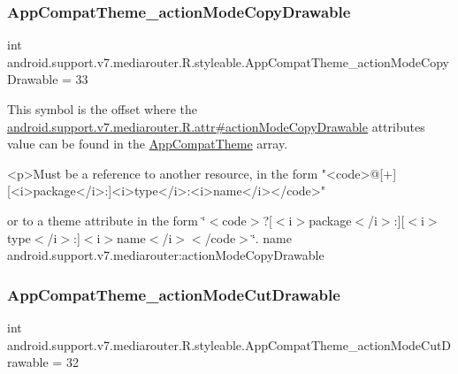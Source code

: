 \subsubsection{\texorpdfstring{App\+Compat\+Theme\+\_\+action\+Mode\+Copy\+Drawable}{AppCompatTheme\_actionModeCopyDrawable}}
{\footnotesize\ttfamily int android.\+support.\+v7.\+mediarouter.\+R.\+styleable.\+App\+Compat\+Theme\+\_\+action\+Mode\+Copy\+Drawable = 33\hspace{0.3cm}{\ttfamily [static]}}

This symbol is the offset where the \hyperlink{classandroid_1_1support_1_1v7_1_1mediarouter_1_1R_1_1attr_ae86be6b245df77092069eab5783ebd50}{android.\+support.\+v7.\+mediarouter.\+R.\+attr\#action\+Mode\+Copy\+Drawable} attribute\textquotesingle{}s value can be found in the \hyperlink{classandroid_1_1support_1_1v7_1_1mediarouter_1_1R_1_1styleable_a4e3d3900c75d49aeb2f283cac00214d6}{App\+Compat\+Theme} array.

\begin{DoxyVerb}      <p>Must be a reference to another resource, in the form "<code>@[+][<i>package</i>:]<i>type</i>:<i>name</i></code>"
\end{DoxyVerb}
 or to a theme attribute in the form \char`\"{}$<$code$>$?\mbox{[}$<$i$>$package$<$/i$>$\+:\mbox{]}\mbox{[}$<$i$>$type$<$/i$>$\+:\mbox{]}$<$i$>$name$<$/i$>$$<$/code$>$\char`\"{}.  name android.\+support.\+v7.\+mediarouter\+:action\+Mode\+Copy\+Drawable \mbox{\label{classandroid_1_1support_1_1v7_1_1mediarouter_1_1R_1_1styleable_add6ca7722d70aa9fa921307092178367}} 
\subsubsection{\texorpdfstring{App\+Compat\+Theme\+\_\+action\+Mode\+Cut\+Drawable}{AppCompatTheme\_actionModeCutDrawable}}
{\footnotesize\ttfamily int android.\+support.\+v7.\+mediarouter.\+R.\+styleable.\+App\+Compat\+Theme\+\_\+action\+Mode\+Cut\+Drawable = 32\hspace{0.3cm}{\ttfamily [static]}}


